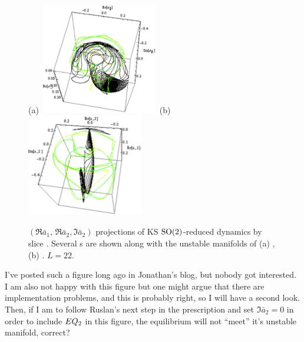 \begin{figure}
 (a)~\includegraphics[width=0.45\textwidth]{../figs/ksRotatedTW1um.eps}\,
 (b)~\includegraphics[width=0.45\textwidth]{../figs/ksRotatedE2um.eps}
\caption{
 $(\Re \bar{a}_1,\,\Re \bar{a}_2,\Im \bar{a}_2)$ projections of KS
 $\textrm{SO}(2)$-reduced dynamics by slice .
 Several \rpo s are shown along with the
 unstable manifolds of (a) , (b) . $L=22$.
}
\end{figure}

I've posted such a figure long ago in Jonathan's blog, but
nobody got interested. I am also not happy with this figure
but one might argue that there are implementation problems,
and this is probably right, so I will have a second look.
Then, if I am to follow Ruslan's next step in the
prescription and set $\Im \bar{a}_2 =0$ in order to include
$EQ_{2}$ in this figure, the equilibrium will not ``meet''
it's unstable manifold, correct?

